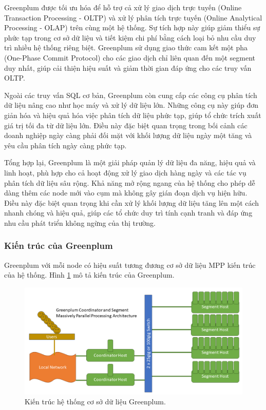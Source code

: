 \documentclass{article}[14pt]
\begin{document}
Greenplum được tối ưu hóa để hỗ trợ cả xử lý giao dịch trực tuyến (Online Transaction Processing - OLTP) và xử lý phân tích trực tuyến (Online Analytical Processing - OLAP) trên cùng một hệ thống. Sự tích hợp này giúp giảm thiểu sự phức tạp trong cơ sở dữ liệu và tiết kiệm chi phí bằng cách loại bỏ nhu cầu duy trì nhiều hệ thống riêng biệt. Greenplum sử dụng giao thức cam kết một pha (One-Phase Commit Protocol) cho các giao dịch chỉ liên quan đến một segment duy nhất, giúp cải thiện hiệu suất và giảm thời gian đáp ứng cho các truy vấn OLTP.

Ngoài các truy vấn SQL cơ bản, Greenplum còn cung cấp các công cụ phân tích dữ liệu nâng cao như học máy và xử lý dữ liệu lớn. Những công cụ này giúp đơn giản hóa và hiệu quả hóa việc phân tích dữ liệu phức tạp, giúp tổ chức trích xuất giá trị tối đa từ dữ liệu lớn. Điều này đặc biệt quan trọng trong bối cảnh các doanh nghiệp ngày càng phải đối mặt với khối lượng dữ liệu ngày một tăng và yêu cầu phân tích ngày càng phức tạp.

Tổng hợp lại, Greenplum là một giải pháp quản lý dữ liệu đa năng, hiệu quả và linh hoạt, phù hợp cho cả hoạt động xử lý giao dịch hàng ngày và các tác vụ phân tích dữ liệu sâu rộng. Khả năng mở rộng ngang của hệ thống cho phép dễ dàng thêm các node mới vào cụm mà không gây gián đoạn dịch vụ hiện hữu. Điều này đặc biệt quan trọng khi cần xử lý khối lượng dữ liệu tăng lên một cách nhanh chóng và hiệu quả, giúp các tổ chức duy trì tính cạnh tranh và đáp ứng nhu cầu phát triển không ngừng của thị trường.

\subsubsection{Kiến trúc của Greenplum}

Greenplum với mỗi node có hiệu suất tương đương cơ sở dữ liệu MPP kiến trúc của hệ thống. Hình \ref{fig:gp-architecture} mô tả kiến trúc của Greenplum.

\begin{figure}[htbp]
\centerline{\includegraphics[scale=.4]{images/gp-architecture.png}}
\captionsetup{font=Large}
\caption{Kiến trúc hệ thống cơ sở dữ liệu Greenplum\protect\footnotemark.  }
\label{fig:gp-architecture}
\end{figure}
\end{document}
